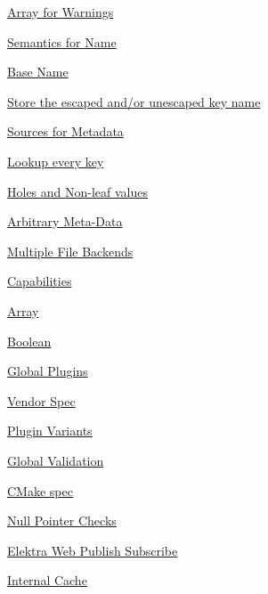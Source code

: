 \begin{DoxyItemize}
\item \hyperlink{doc_decisions_warning_array_md}{Array for Warnings}
\end{DoxyItemize}


\begin{DoxyItemize}
\item \hyperlink{doc_decisions_semantics_name_md}{Semantics for Name}
\item \hyperlink{doc_decisions_base_name_md}{Base Name}
\item \hyperlink{doc_decisions_store_name_md}{Store the escaped and/or unescaped key name}
\item \hyperlink{doc_decisions_metadata_sources_md}{Sources for Metadata}
\item \hyperlink{doc_decisions_lookup_every_key_md}{Lookup every key}
\item \hyperlink{doc_decisions_holes_md}{Holes and Non-\/leaf values}
\item \hyperlink{doc_decisions_arbitrary_metadata_md}{Arbitrary Meta-\/\+Data}
\item \hyperlink{doc_decisions_multiple_file_backends_md}{Multiple File Backends}
\item \hyperlink{doc_decisions_capabilities_md}{Capabilities}
\item \hyperlink{doc_decisions_array_md}{Array}
\item \hyperlink{doc_decisions_boolean_md}{Boolean}
\item \hyperlink{doc_decisions_global_plugins_md}{Global Plugins}
\item \hyperlink{doc_decisions_vendor_spec_md}{Vendor Spec}
\item \hyperlink{doc_decisions_plugin_variants_md}{Plugin Variants}
\item \hyperlink{doc_decisions_global_validation_md}{Global Validation}
\end{DoxyItemize}


\begin{DoxyItemize}
\item \hyperlink{doc_decisions_cmake_spec_md}{C\+Make spec}
\item \hyperlink{doc_decisions_null_pointer_checks_md}{Null Pointer Checks}
\item \hyperlink{doc_decisions_elektra_web_pubsub_md}{Elektra Web Publish Subscribe}
\item \hyperlink{doc_decisions_internal_cache_md}{Internal Cache} 
\end{DoxyItemize}